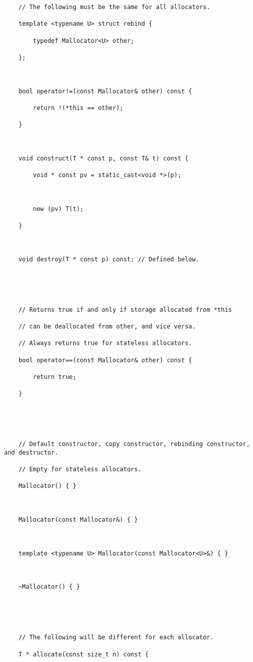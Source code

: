 {\begin{lstlisting}
    // The following must be the same for all allocators.

    template <typename U> struct rebind {

        typedef Mallocator<U> other;

    };

 

    bool operator!=(const Mallocator& other) const {

        return !(*this == other);

    }

 

    void construct(T * const p, const T& t) const {

        void * const pv = static_cast<void *>(p);

 

        new (pv) T(t);

    }

 

    void destroy(T * const p) const; // Defined below.

 

 

    // Returns true if and only if storage allocated from *this

    // can be deallocated from other, and vice versa.

    // Always returns true for stateless allocators.

    bool operator==(const Mallocator& other) const {

        return true;

    }

 

 

    // Default constructor, copy constructor, rebinding constructor, and destructor.

    // Empty for stateless allocators.

    Mallocator() { }

 

    Mallocator(const Mallocator&) { }

 

    template <typename U> Mallocator(const Mallocator<U>&) { }

 

    ~Mallocator() { }

 

 

    // The following will be different for each allocator.

    T * allocate(const size_t n) const {


\end{lstlisting}}
